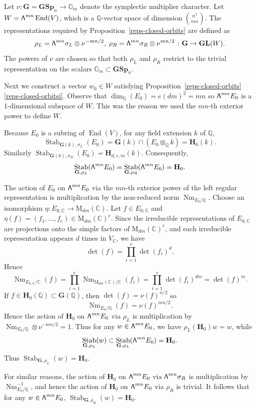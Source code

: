 \documentclass[11pt]{article}
\numberwithin{equation}{section}
\newcommand\bw{{\hbox{\large$\mathsf{\Lambda}$}}}
\newcommand{\bC}{\mathbb{C}}
\newcommand{\bG}{\mathbb{G}}
\newcommand{\bQ}{\mathbb{Q}}
\newcommand{\gG}{\mathbf{G}}
\newcommand{\gGL}{\mathbf{GL}}
\newcommand{\gGSp}{\mathbf{GSp}}
\newcommand{\gH}{\mathbf{H}}
\newcommand{\rM}{\mathrm{M}}
\DeclareMathOperator{\End}{End}
\DeclareMathOperator{\Nm}{Nm}
\DeclareMathOperator{\Stab}{Stab}
\let\extpower\bw
\begin{document}
Let $\nu \colon \gG = \gGSp_n \to \bG_m$ denote the symplectic multiplier character.
Let $W = \extpower^{mn} \End(V)$, which is a $\bQ$-vector space of dimension $\binom{n^2}{mn}$.
The representations required by Proposition~\ref{reps-closed-orbits} are defined as
\[
\rho_L = \extpower^{mn} \sigma_L \otimes \nu^{-mn/2}, \; \rho_R = \extpower^{mn} \sigma_R \otimes \nu^{mn/2} \; \colon \gG \to \gGL(W).
\]
The powers of $\nu$ are chosen so that both $\rho_L$ and $\rho_R$ restrict to the trivial representation on the scalars $\bG_m \subset \gGSp_n$.

Next we construct a vector $w_0 \in W$ satisfying Proposition~\ref{reps-closed-orbits}\eqref{reps-closed-orbitsi}.
Observe that $\dim_\bQ(E_0) = e(dm)^2 = mn$ so $\extpower^{mn} E_0$ is a 1-dimensional subspace of $W$.
This was the reason we used the $mn$-th exterior power to define $W$.

Because $E_0$ is a subring of $\End(V)$,
for any field extension $k$ of $\bQ$,
\[
\Stab_{\gG(k),\sigma_L}(E_0) = \gG(k) \cap (E_0 \otimes_\bQ k) = \gH_0(k).
\]
Similarly $\Stab_{\gG(k),\sigma_R}(E_0) = \gH_{d,e,m}(k)$.
Consequently,
\[
\Stab_{\gG,\rho_L}(\extpower^{mn} E_0) = \Stab_{\gG,\rho_R}(\extpower^{mn} E_0) = \gH_0.
\]

The action of $E_0$ on $\extpower^{mn} E_0$ via the $mn$-th exterior power of the left regular representation is multiplication by the non-reduced norm $\Nm_{E_0/\bQ}$.
Choose an isomorphism $\eta \colon E_{0,\bC} \to \rM_{dm}(\bC)$.
Let $f \in E_{0,\bC}$ and $\eta(f) = (f_1, \dotsc, f_e) \in \rM_{dm}(\bC)^e$.
Since the irre\-ducible representations of $E_{0,\bC}$ are projections onto the simple factors of $\rM_{dm}(\bC)^e$, and each irreducible representation appears $d$ times in $V_\bC$, we have
\[
\det(f) = \prod_{i=1}^e \det(f_i)^d.
\]
Hence
\[
\Nm_{E_{0,\bC}/\bC}(f) = \prod_{i=1}^e \Nm_{\rM_{dm}(\bC)/\bC}(f_i) = \prod_{i=1}^e \det(f_i)^{dm} = \det(f)^m.
\]
If $f \in \gH_0(\bQ) \subset \gG(\bQ)$, then $\det(f) = \nu(f)^{n/2}$ so
\[
\Nm_{E_0/\bQ}(f) = \nu(f)^{mn/2}.
\]
Hence the action of $\gH_0$ on $\extpower^{mn} E_0$ via $\rho_L$ is multiplication by $\Nm_{E_0/\bQ} \otimes \nu^{-mn/2} = 1$.
Thus for any $w \in \extpower^{mn} E_0$, we have $\rho_L(\gH_0)w = w$, while
\[
\Stab_{\gG,\rho_L}(w) \subset \Stab_{\gG,\rho_L}(\extpower^{mn} E_0) = \gH_0.
\]
Thus $\Stab_{\gG,\rho_L}(w) = \gH_0$.

For similar reasons, the action of $\gH_0$ on $\extpower^{mn} E_0$ via $\extpower^{mn} \sigma_R$ is multiplication by $\Nm_{E_0/\bQ}^{-1}$, and hence the action of $\gH_0$ on $\extpower^{mn} E_0$ via $\rho_R$ is trivial.
It follows that for any $w \in \extpower^{mn} E_0$, $\Stab_{\gG,\rho_R}(w) = \gH_0$.
\end{document}
